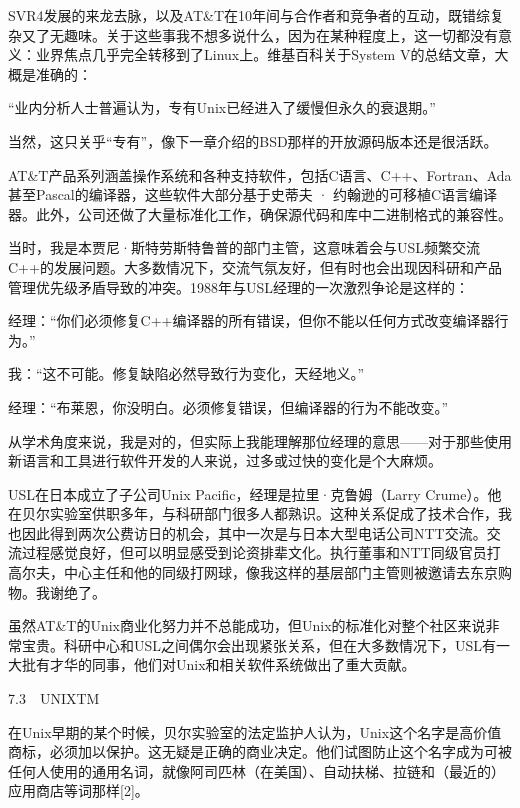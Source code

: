 \documentclass[a4paper,12pt,UTF8,twoside]{ctexbook}
\begin{document}
{{SVR4发展的来龙去脉，以及AT\&T在10年间与合作者和竞争者的互动，既错综复杂又了无趣味。关于这些事我不想多说什么，因为在某种程度上，这一切都没有意义：业界焦点几乎完全转移到了Linux上。维基百科关于System V的总结文章，大概是准确的：

“业内分析人士普遍认为，专有Unix已经进入了缓慢但永久的衰退期。”



当然，这只关乎“专有”，像下一章介绍的BSD那样的开放源码版本还是很活跃。

AT\&T产品系列涵盖操作系统和各种支持软件，包括C语言、C++、Fortran、Ada甚至Pascal的编译器，这些软件大部分基于史蒂夫 · 约翰逊的可移植C语言编译器。此外，公司还做了大量标准化工作，确保源代码和库中二进制格式的兼容性。

当时，我是本贾尼·斯特劳斯特鲁普的部门主管，这意味着会与USL频繁交流C++的发展问题。大多数情况下，交流气氛友好，但有时也会出现因科研和产品管理优先级矛盾导致的冲突。1988年与USL经理的一次激烈争论是这样的：

经理：“你们必须修复C++编译器的所有错误，但你不能以任何方式改变编译器行为。”

我：“这不可能。修复缺陷必然导致行为变化，天经地义。”

经理：“布莱恩，你没明白。必须修复错误，但编译器的行为不能改变。”



从学术角度来说，我是对的，但实际上我能理解那位经理的意思——对于那些使用新语言和工具进行软件开发的人来说，过多或过快的变化是个大麻烦。

USL在日本成立了子公司Unix Pacific，经理是拉里·克鲁姆（Larry Crume）。他在贝尔实验室供职多年，与科研部门很多人都熟识。这种关系促成了技术合作，我也因此得到两次公费访日的机会，其中一次是与日本大型电话公司NTT交流。交流过程感觉良好，但可以明显感受到论资排辈文化。执行董事和NTT同级官员打高尔夫，中心主任和他的同级打网球，像我这样的基层部门主管则被邀请去东京购物。我谢绝了。

虽然AT\&T的Unix商业化努力并不总能成功，但Unix的标准化对整个社区来说非常宝贵。科研中心和USL之间偶尔会出现紧张关系，但在大多数情况下，USL有一大批有才华的同事，他们对Unix和相关软件系统做出了重大贡献。





7.3　UNIXTM


在Unix早期的某个时候，贝尔实验室的法定监护人认为，Unix这个名字是高价值商标，必须加以保护。这无疑是正确的商业决定。他们试图防止这个名字成为可被任何人使用的通用名词，就像阿司匹林（在美国）、自动扶梯、拉链和（最近的）应用商店等词那样[2]。

}}
\end{document}
